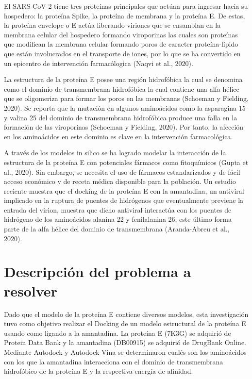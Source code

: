 \documentclass[titlepage, 12pt]{article}
\begin{document}
El SARS-CoV-2 tiene tres proteínas principales que actúan para ingresar hacia su hospedero: la proteína Spike, la proteína de membrana y la proteína E. De estas, la proteína envelope o E actúa liberando viriones que se ensamblan en la membrana celular del hospedero formando viroporinas las cuales son proteínas que modifican la membrana celular formando poros de caracter proteína-lípido que están involucrados en el transporte de iones, por lo que se ha convertido en un epicentro de intervención farmacólogica (Naqvi et al., 2020).

La estructura de la proteína E posee una región hidrofóbica la cual se denomina como el dominio de transmembrana hidrofóbica la cual contiene una alfa hélice que se oligomeriza para formar los poros en las membranas (Schoeman y Fielding, 2020). Se reporta que la mutación en algunos aminoácidos como la asparagina 15 y valina 25 del dominio de transmembrana hidrofóbica produce una falla en la formación de las viroporinas (Schoeman y Fielding, 2020). Por tanto, la afección en los aminoácidos en este dominio es clave en la intervención farmacológica.

A través de los modelos in silico se ha logrado modelar la interacción de la estructura de la proteína E con potenciales fármacos como fitoquímicos (Gupta et al., 2020). Sin embargo, se necesita el uso de fármacos estandarizados y de fácil acceso económico y de receta médica disponible para la población. Un estudio reciente muestra que el docking de la proteína E con la amantadina, un antiviral implicado en la ruptura de puentes de hidrógenos que eventualmente previene la entrada del virion, muestra que dicho antiviral interactúa con los puentes de hidrógeno de los aminoácidos alanina 22 y fenilalanina 26, este último forma parte de la alfa hélice del dominio de transmembrana (Aranda-Abreu et al., 2020). 


\section{Descripción del problema a resolver}

Dado que el modelo de la proteína E contiene diversos modelos, esta investigación tuvo como objetivo realizar el Docking de un modelo estructural de la proteína E usando como ligando a la amantadina. La proteína E (7K3G) se adquirió de Protein Data Bank y la amantadina (DB00915) se adquirió de DrugBank Online. Mediante Autodock y Autodock Vina se determinaron cualés son los aminoácidos con los que la amantadina interacciona con el dominio de transmembrana hidrofóbico de la proteína E y la respectiva energía de afinidad. 
\end{document}
